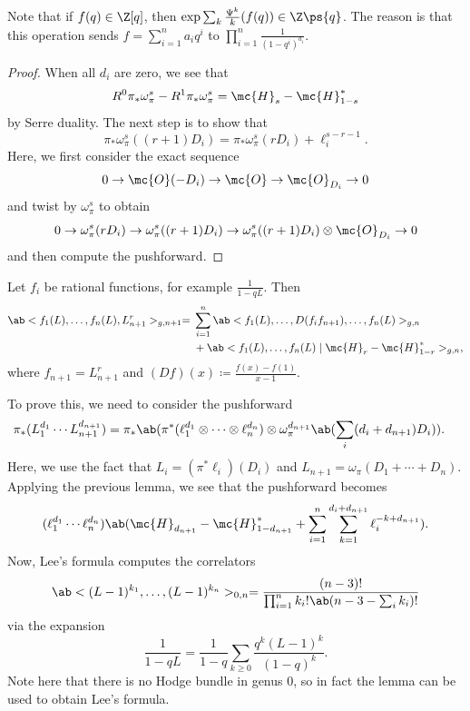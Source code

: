\begin{rmk}
    Note that if \(f(q) \in \Z[q]\), then \(\exp \sum_k \frac{\Psi^k}{k} (f(q)) \in \Z \ps{q}\). The reason is that this operation sends \(f = \sum_{i=1}^{n} a_i q^i\) to \(\prod_{i=1}^n \frac{1}{(1-q^i)^{a_i}}\).
\end{rmk}

\begin{proof}
    When all \(d_i\) are zero, we see that
    \[ R^0 \pi_* \omega_{\pi}^s - R^1 \pi_* \omega_{\pi}^s = \mc{H}_s - \mc{H}_{1-s}^* \]
    by Serre duality. The next step is to show that
    \[ \pi_* \omega_{\pi}^s ((r+1)D_i) = \pi_* \omega_{\pi}^s(r D_i) + \ell_i^{s-r-1}. \]
    Here, we first consider the exact sequence
    \[ 0 \to \mc{O} (-D_i) \to \mc{O} \to \mc{O}_{D_i} \to 0 \]
    and twist by \(\omega_{\pi}^s\) to obtain
    \[ 0 \to \omega_{\pi}^s(r D_i) \to \omega_{\pi}^s ((r+1)D_i) \to \omega_{\pi}^s ((r+1)D_i) \otimes \mc{O}_{D_i} \to 0 \]
    and then compute the pushforward.
\end{proof}

\begin{lem}
    Let \(f_i\) be rational functions, for example \(\frac{1}{1-q L}\). Then
    \begin{align*}
        \ab<f_1(L), \ldots, f_n(L), L_{n+1}^r>_{g, n+1} ={}& \sum_{i=1}^n \ab<f_1(L), \ldots, D(f_i f_{n+1}), \ldots, f_n(L)>_{g, n} \\
        &+ \ab<f_1(L), \ldots, f_n(L) \mid \mc{H}_r - \mc{H}_{1-r}^*>_{g,n},
    \end{align*}
    where \(f_{n+1} = L_{n+1}^r\) and \((Df)(x) \coloneqq \frac{f(x)-f(1)}{x-1}\).
\end{lem}

To prove this, we need to consider the pushforward
\begin{align*}
    \pi_* (L_1^{d_1} \cdots L_{n+1}^{d_{n+1}}) &= \pi_* \ab(\pi^*(\ell_1^{d_1} \otimes \cdots \otimes \ell_n^{d_n}) \otimes \omega_{\pi}^{d_{n+1}}\ab(\sum_i (d_i+d_{n+1})D_i)).
\end{align*}
Here, we use the fact that \(L_i = (\pi^* \ell_i)(D_i)\) and \(L_{n+1} = \omega_{\pi}(D_1 + \cdots + D_n)\). Applying the previous lemma, we see that the pushforward becomes
\[ (\ell_1^{d_1} \cdots \ell_n^{d_n})\ab(\mc{H}_{d_{n+1}} - \mc{H}_{1-d_{n+1}}^* + \sum_{i=1}^n \sum_{k=1}^{d_i + d_{n+1}} \ell_i^{-k+d_{n+1}}). \]
Now, Lee's formula computes the correlators
\[ \ab<(L-1)^{k_1}, \ldots, (L-1)^{k_n}>_{0,n} = \frac{(n-3)!}{\prod_{i=1}^n k_i! \ab(n-3-\sum_i k_i)!} \]
via the expansion
\[ \frac{1}{1-qL} = \frac{1}{1-q} \sum_{k \geq 0} \frac{q^k(L-1)^k}{(1-q)^k}. \]
Note here that there is no Hodge bundle in genus \(0\), so in fact the lemma can be used to obtain Lee's formula.

